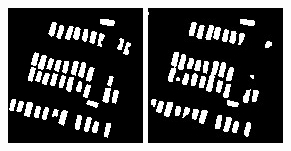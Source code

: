 \documentclass[a4paper,11pt]{article}
\begin{document}
\begin{figure}[H]
  \includegraphics[width=\linewidth]{class_vs_w/label_1}
\endminipage\hfill
{}
  \includegraphics[width=\linewidth]{class_vs_w/un_weight_1}

\end{figure}
\end{document}
